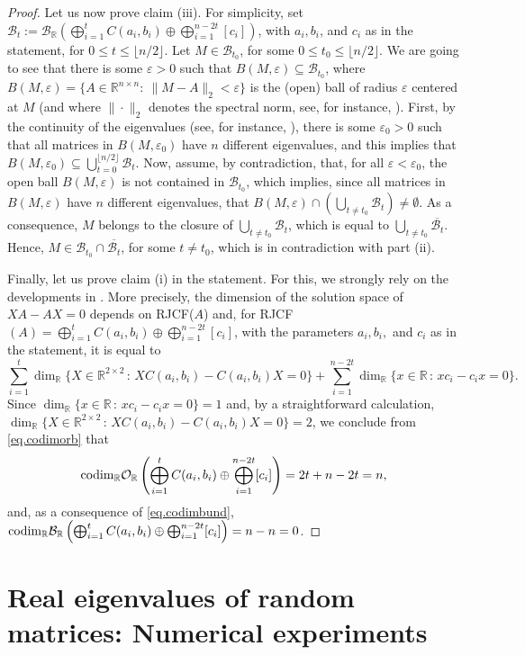 \documentclass[a4paper]{article}
\newcommand{\R}{\mathbb R}
\newcommand{\orbr}{{\mathcal O}_{\R}}
\newcommand{\bun}{{\mathcal B}}
\newcommand{\bunr}{{\mathcal B}_{\R}}
\newcommand{\cod}{{\rm codim}_\R}
\begin{document}
\begin{proof}
 Let us now prove claim (iii). For simplicity, set $\bun_t:=\bunr \left(\bigoplus_{i=1}^tC(a_i,b_i)\oplus\bigoplus_{i=1}^{n-2t}[c_i]\right)$, with $a_i, b_i$, and $c_i$ as in the statement, for $0\leq t\leq\lfloor n/2\rfloor$. Let $M\in\bun_{t_0}$, for some $0\leq t_0\leq\lfloor n/2\rfloor$. We are going to see that there is some $\varepsilon>0$ such that $B(M,\varepsilon)\subseteq \bun_{t_0}$, where $B(M,\varepsilon)=\{A\in\R^{n\times n}:\ \|M-A\|_2<\varepsilon\}$ is the (open) ball of radius $\varepsilon$ centered at $M$ (and where $\|\cdot\|_2$ denotes the spectral norm, see, for instance, \cite[Example 5.6.6]{hj13}). First, by the continuity of the eigenvalues (see, for instance, \cite[Th. D.2]{hj13}), there is some $\varepsilon_0>0$ such that all matrices in $B(M,\varepsilon_0)$ have $n$ different eigenvalues, and this implies that $B(M,\varepsilon_0)\subseteq \bigcup_{t=0}^{\lfloor n/2\rfloor}\bun_t$. Now, assume, by contradiction, that, for all $\varepsilon<\varepsilon_0$, the open ball $B(M,\varepsilon)$ is not contained in $\bun_{t_0}$, which implies, since all matrices in $B(M,\varepsilon)$ have $n$ different eigenvalues, that $B(M,\varepsilon)\cap \left(\bigcup_{t\neq t_0}\bun_t\right)\neq\emptyset$. As a consequence, $M$ belongs to the closure of $\bigcup_{t\neq t_0}\bun_t$, which is equal to $\bigcup_{t\neq t_0}\overline{\bun_t}$. Hence, $M\in\bun_{t_0}\cap\overline{\bun_t}$, for some $t\neq t_0$, which is in contradiction with part (ii).


Finally, let us prove claim (i) in the statement. For this, we strongly rely on the developments in \cite[Ch. VIII]{gant}. More precisely, the dimension of the solution space of $XA-AX=0$ depends on RJCF($A$) and, for RJCF$(A)=\bigoplus_{i=1}^tC(a_i,b_i)\oplus\bigoplus_{i=1}^{n-2t}[c_i]$, with the parameters $a_i, b_i,$ and $ c_i$ as in the statement, it is equal to
$$
\sum_{i=1}^t \dim_\R\{ X\in\R^{2\times 2} \, : \, XC(a_i,b_i)-C(a_i,b_i)X=0 \}+\sum_{i=1}^{n-2t}\dim_\R\{ x\in\R \, : \, xc_i-c_ix=0 \}.
$$
Since $\dim_\R\{ x\in\R \, : \, xc_i-c_ix=0 \} =1$ and, by a straightforward calculation, $\dim_\R\{ X\in\R^{2\times 2} \, : \, XC(a_i,b_i)-C(a_i,b_i)X=0 \}=2$, we conclude from \eqref{eq.codimorb} that
$$
\cod\orbr\left(\bigoplus_{i=1}^tC(a_i,b_i)\oplus\bigoplus_{i=1}^{n-2t}[c_i]\right)=2t+ n - 2t=n,
$$
and, as a consequence of \eqref{eq.codimbund}, $\cod\bunr\left(\bigoplus_{i=1}^tC(a_i,b_i)\oplus\bigoplus_{i=1}^{n-2t}[c_i]\right)=n-n=0$.
\end{proof}

\section{ Real eigenvalues of random matrices: Numerical experiments}\label{random.sec}
\end{document}
